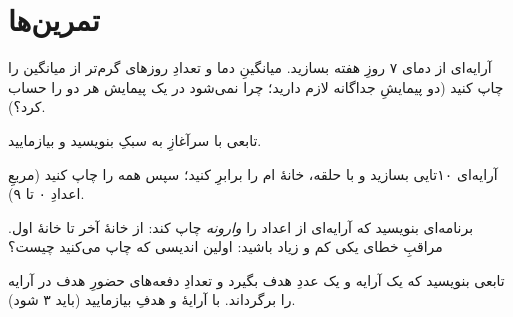 \section{تمرین‌ها}

\exercise آرایه‌ای از دمای ۷ روزِ هفته بسازید. میانگینِ دما و تعدادِ
روزهای گرم‌تر از میانگین را چاپ کنید (دو پیمایشِ جداگانه لازم دارید؛
چرا نمی‌شود در یک پیمایش هر دو را حساب کرد؟).

\exercise تابعی با سرآغازِ  به سبکِ
 بنویسید و بیازمایید.

\exercise آرایه‌ای ۱۰تایی بسازید و با حلقه، خانهٔ ام را برابرِ
 کنید؛ سپس همه را چاپ کنید (مربعِ اعدادِ ۰ تا ۹).

\exercise برنامه‌ای بنویسید که آرایه‌ای از اعداد را \emph{وارونه} چاپ کند:
از خانهٔ آخر تا خانهٔ اول. مراقبِ خطای یکی کم و زیاد باشید: اولین اندیسی
که چاپ می‌کنید چیست؟

\exercise تابعی بنویسید که یک آرایه و یک عددِ هدف بگیرد و تعدادِ دفعه‌های
حضورِ هدف در آرایه را برگرداند. با آرایهٔ
\code{[3, 7, 3, 3, 1]} و هدفِ  بیازمایید (باید ۳ شود).

